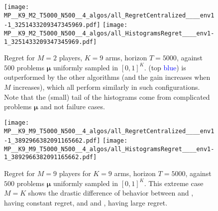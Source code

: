 %
%

\begin{figure}[!h]
    \centering
        \texttt{[image: MP\_\_K9\_M2\_T5000\_N500\_\_4\_algos/all\_RegretCentralized\_\_\_\_env1-1\_3251433209347345969.pdf]}
        \texttt{[image: MP\_\_K9\_M2\_T5000\_N500\_\_4\_algos/all\_HistogramsRegret\_\_\_\_env1-1\_3251433209347345969.pdf]}
    \caption[Regret for $M=2$ players, $K=9$ arms, horizon $T=5000$, against $500$ problems $\boldsymbol{\mu}$ uniformly sampled]{Regret for $M=2$ players, $K=9$ arms, horizon $T=5000$, against $500$ problems $\boldsymbol{\mu}$ uniformly sampled in $[0,1]^K$. \rhoRand{} (top \textcolor{blue}{blue}) is outperformed by the other algorithms (and the gain increases when $M$ increases), which all perform similarly in such configurations. Note that the (small) tail of the histograms come from complicated problems $\boldsymbol{\mu}$ and not failure cases.}
    \label{fig:5:MP__K9_M2_T5000_N500__4_algos__all_RegretCentralized__BayesianProblems}
\end{figure}


\begin{figure}[!h]
    \centering
        \texttt{[image: MP\_\_K9\_M9\_T5000\_N500\_\_4\_algos/all\_RegretCentralized\_\_\_\_env1-1\_3892966382091165662.pdf]}
        \texttt{[image: MP\_\_K9\_M9\_T5000\_N500\_\_4\_algos/all\_HistogramsRegret\_\_\_\_env1-1\_3892966382091165662.pdf]}
    \caption[Regret for $M=9$ players for $K=9$ arms, horizon $T=5000$, against $500$ problems $\boldsymbol{\mu}$ uniformly sampled]{Regret for $M=9$ players for $K=9$ arms, horizon $T=5000$, against $500$ problems $\boldsymbol{\mu}$ uniformly sampled in $[0,1]^K$. This extreme case $M=K$ shows the drastic difference of behavior between \RandTopM{} and \MCTopM, having constant regret, and \rhoRand{} and \Selfish, having large regret.}
    \label{fig:5:MP__K9_M9_T5000_N500__4_algos__all_HistogramsRegret}
\end{figure}


